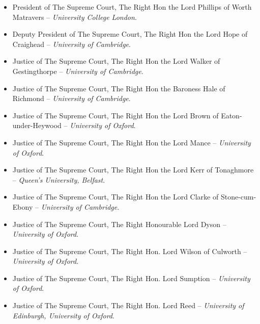 \documentclass[11pt]{article}
\begin{document}
\begin{itemize}
	\item{President of The Supreme Court, The Right Hon the Lord
Phillips of Worth Matravers -- \textsl{University College London}.}
	\item{Deputy President of The Supreme Court, The Right Hon the Lord
Hope of Craighead -- \textsl{University of Cambridge}.}
	\item{Justice of The Supreme Court, The Right Hon the Lord Walker
of Gestingthorpe -- \textsl{University of Cambridge}.}
	\item{Justice of The Supreme Court, The Right Hon the Baroness Hale
of Richmond -- \textsl{University of Cambridge}.}
	\item{Justice of The Supreme Court, The Right Hon the Lord Brown of
Eaton-under-Heywood -- \textsl{University of Oxford}.}
	\item{Justice of The Supreme Court, The Right Hon the Lord Mance --
\textsl{University of Oxford}.}
	\item{Justice of The Supreme Court, The Right Hon the Lord Kerr of
Tonaghmore -- \textsl{Queen’s University, Belfast}.}
	\item{Justice of The Supreme Court, The Right Hon the Lord Clarke
of Stone-cum-Ebony -- \textsl{University of Cambridge}.}
	\item{Justice of The Supreme Court, The Right Honourable Lord Dyson
-- \textsl{University of Oxford}.}
	\item{Justice of The Supreme Court, The Right Hon. Lord Wilson of
Culworth -- \textsl{University of Oxford}.}
	\item{Justice of The Supreme Court, The Right Hon. Lord Sumption --
\textsl{University of Oxford}.}
	\item{Justice of The Supreme Court, The Right Hon. Lord Reed --
\textsl{University of Edinburgh, University of Oxford}.}
\end{itemize}
 
\end{document}
